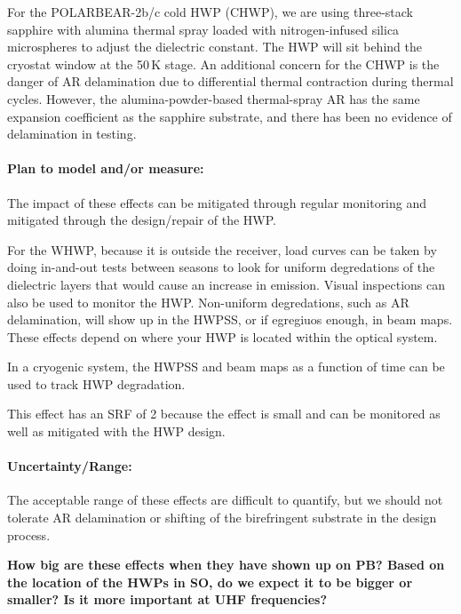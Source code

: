 For the POLARBEAR-2b/c cold HWP (CHWP), we are using three-stack sapphire with alumina thermal spray loaded with nitrogen-infused silica microspheres to adjust the dielectric constant. The HWP will sit behind the cryostat window at the 50\,K stage. An additional concern for the CHWP is the danger of AR delamination due to differential thermal contraction during thermal cycles. However, the alumina-powder-based thermal-spray AR has the same expansion coefficient as the sapphire substrate, and there has been no evidence of delamination in testing.
  
\paragraph{Plan to model and/or measure:}
The impact of these effects can be mitigated through regular monitoring and mitigated through the design/repair of the HWP.

For the WHWP, because it is outside the receiver, load curves can be taken by doing in-and-out tests between seasons to look for uniform degredations of the dielectric layers that would cause an increase in emission. Visual inspections can also be used to monitor the HWP. Non-uniform degredations, such as AR delamination, will show up in the HWPSS, or if egregiuos enough, in beam maps. These effects depend on where your HWP is located within the optical system.

In a cryogenic system, the HWPSS and beam maps as a function of time can be used to track HWP degradation.

This effect has an SRF of 2 because the effect is small and can be monitored as well as mitigated with the HWP design.

\paragraph{Uncertainty/Range:}

The acceptable range of these effects are difficult to quantify, but we should not tolerate AR delamination or shifting of the birefringent substrate in the design process. 

\textbf{How big are these effects when they have shown up on PB? Based on the location of the HWPs in SO, do we expect it to be bigger or smaller? Is it more important at UHF frequencies?}

